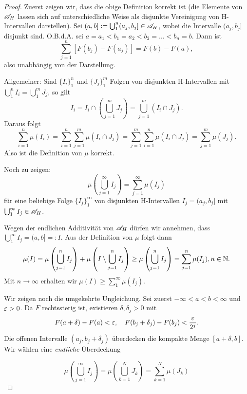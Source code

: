 \documentclass[
 a4paper,
 12pt,
 parskip=half
 ]{scrreprt}
\theoremstyle{plain}
\theoremstyle{definition}
\numberwithin{equation}{section}
\begin{document}
\begin{proof}
 Zuerst zeigen wir, dass die obige Definition korrekt ist (die Elemente von $\mathscr{A}_H$ lassen sich auf unterschiedliche Weise als disjunkte Vereinigung von H-Intervallen darstellen). Sei $(a,b] := \bigcup_1^n (a_j, b_j] \in \mathscr{A}_H$, wobei die Intervalle $(a_j, b_j]$ disjunkt sind. O.B.d.A. sei $a = a_1 < b_1 = a_2 < b_2 = \ldots < b_n = b$. Dann ist
 \[ \sum_{j=1}^n [ F( b_j ) - F(a_j) ] = F(b) - F(a), \]
 also unabhängig von der Darstellung. 
 
 Allgemeiner: Sind $\{ I_i \}_1^n$ und $\{ J_j \}_1^m$ Folgen von disjunkten H-Intervallen mit $\bigcup_1^n I_i = \bigcup_1^m J_j$, so gilt
 \[ I_i = I_i \cap \left( \bigcup_{j=1}^m J_j \right) = \bigcup_{j=1}^m ( I_i \cap J_j ). \]
 Daraus folgt
 \[ \sum_{i=1}^n \mu(I_i) = \sum_{i=1}^n \sum_{j=1}^m \mu( I_i \cap J_j ) = \sum_{j=1}^m \sum_{i=1}^n \mu( I_i \cap J_j ) =  \sum_{j=1}^m \mu(J_j). \]
 Also ist die Definition von $\mu$ korrekt.
 
 Noch zu zeigen:
 \[ \mu \left( \bigcup_{j=1}^\infty I_j \right) = \sum_{j=1}^\infty \mu(I_j) \]
 für eine beliebige Folge $\{ I_j \}_1^\infty$ von disjunkten H-Intervallen $I_j = (a_j, b_j]$ mit $\bigcup_1^\infty I_j \in \mathscr{A}_H$. 
 
 Wegen der endlichen Additivität von $\mathscr{A}_H$ dürfen wir annehmen, dass $\bigcup_1^\infty I_j = (a,b] =: I$. Aus der Definition von $\mu$ folgt dann
 \[ \mu(I) = \mu \left( \bigcup_{j=1}^n I_j \right) + \mu \left( I \setminus \bigcup_{j=1}^n I_j \right)
    \ge \mu\left( \bigcup_{j=1}^n I_j \right) = \sum_{j=1}^n \mu( I_j ), n \in \mathbb{N}. \]
 Mit $n \to \infty$ erhalten wir $\mu(I) \ge \sum_1^\infty \mu( I_j )$. 
 
 Wir zeigen noch die umgekehrte Ungleichung. Sei zuerst $- \infty < a < b < \infty $ und $\varepsilon > 0$. Da $F$ rechtsstetig ist, existieren $\delta, \delta_j > 0$ mit 
 \[ F( a + \delta ) - F(a) < \varepsilon, \quad F(b_j + \delta_j) - F(b_j) < \frac{\varepsilon}{2^j}. \]
 Die offenen Intervalle $(a_j, b_j + \delta_j)$ überdecken die kompakte Menge $[a + \delta, b]$. Wir wählen eine \emph{endliche} Überdeckung
 
 
 \[ \mu \left( \bigcup_{j=1}^\infty I_j \right) 
    = \mu \left( \bigcup_{k=1}^N J_k \right) = \sum_{k=1}^N \mu(J_k) \]
\end{proof}
\end{document}
